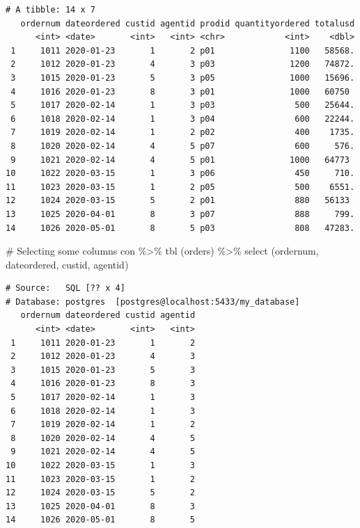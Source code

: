 \documentclass[
  letterpaper,
  DIV=11,
  numbers=noendperiod]{scrreprt}
\newenvironment{Shaded}{\begin{snugshade}}{\end{snugshade}}
\newcommand{\CommentTok}[1]{\textcolor[rgb]{0.37,0.37,0.37}{#1}}
\newcommand{\FunctionTok}[1]{\textcolor[rgb]{0.28,0.35,0.67}{#1}}
\newcommand{\NormalTok}[1]{\textcolor[rgb]{0.00,0.23,0.31}{#1}}
\newcommand{\SpecialCharTok}[1]{\textcolor[rgb]{0.37,0.37,0.37}{#1}}
\newcommand{\StringTok}[1]{\textcolor[rgb]{0.13,0.47,0.30}{#1}}
\begin{document}
\begin{verbatim}
# A tibble: 14 x 7
   ordernum dateordered custid agentid prodid quantityordered totalusd
      <int> <date>       <int>   <int> <chr>            <int>    <dbl>
 1     1011 2020-01-23       1       2 p01               1100   58568.
 2     1012 2020-01-23       4       3 p03               1200   74872.
 3     1015 2020-01-23       5       3 p05               1000   15696.
 4     1016 2020-01-23       8       3 p01               1000   60750 
 5     1017 2020-02-14       1       3 p03                500   25644.
 6     1018 2020-02-14       1       3 p04                600   22244.
 7     1019 2020-02-14       1       2 p02                400    1735.
 8     1020 2020-02-14       4       5 p07                600     576.
 9     1021 2020-02-14       4       5 p01               1000   64773 
10     1022 2020-03-15       1       3 p06                450     710.
11     1023 2020-03-15       1       2 p05                500    6551.
12     1024 2020-03-15       5       2 p01                880   56133 
13     1025 2020-04-01       8       3 p07                888     799.
14     1026 2020-05-01       8       5 p03                808   47283.
\end{verbatim}

\begin{Shaded}
\begin{Highlighting}[]
\CommentTok{\# Selecting some columns }
\NormalTok{con }\SpecialCharTok{\%\textgreater{}\%}
  \FunctionTok{tbl}\NormalTok{ (}\StringTok{\textquotesingle{}orders\textquotesingle{}}\NormalTok{) }\SpecialCharTok{\%\textgreater{}\%}
  \FunctionTok{select}\NormalTok{ (ordernum, dateordered, custid, agentid)}
\end{Highlighting}
\end{Shaded}

\begin{verbatim}
# Source:   SQL [?? x 4]
# Database: postgres  [postgres@localhost:5433/my_database]
   ordernum dateordered custid agentid
      <int> <date>       <int>   <int>
 1     1011 2020-01-23       1       2
 2     1012 2020-01-23       4       3
 3     1015 2020-01-23       5       3
 4     1016 2020-01-23       8       3
 5     1017 2020-02-14       1       3
 6     1018 2020-02-14       1       3
 7     1019 2020-02-14       1       2
 8     1020 2020-02-14       4       5
 9     1021 2020-02-14       4       5
10     1022 2020-03-15       1       3
11     1023 2020-03-15       1       2
12     1024 2020-03-15       5       2
13     1025 2020-04-01       8       3
14     1026 2020-05-01       8       5
\end{verbatim}
\end{document}
